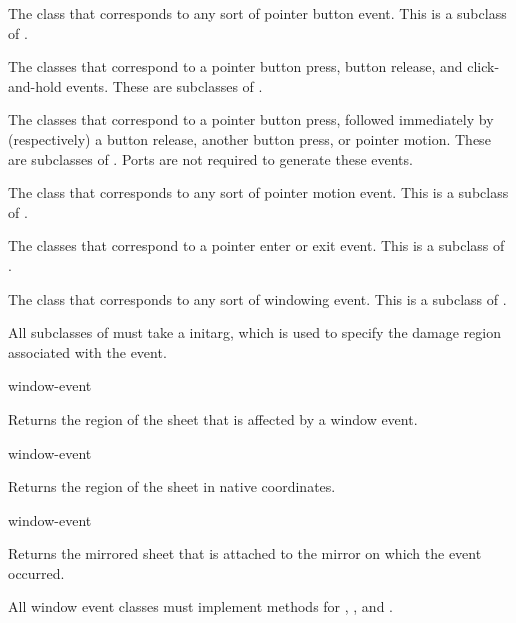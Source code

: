  
The class that corresponds to any sort of pointer button event.  This is a
subclass of .

 
The classes that correspond to a pointer button press, button release, and
click-and-hold events.  These are subclasses of .

 
The classes that correspond to a pointer button press, followed immediately by
(respectively) a button release, another button press, or pointer motion.  These
are subclasses of .  Ports are not required to generate
these events.

 
The class that corresponds to any sort of pointer motion event.  This is a
subclass of .


The classes that correspond to a pointer enter or exit event.  This is a
subclass of .



The class that corresponds to any sort of windowing event.  This is a subclass
of .

All subclasses of  must take a  initarg, which is
used to specify the damage region associated with the event.

 {window-event}

Returns the region of the sheet that is affected by a window event.

 {window-event}

Returns the region of the sheet in native coordinates.

 {window-event}

Returns the mirrored sheet that is attached to the mirror on which the event
occurred.

All window event classes must implement methods for ,
, and .

